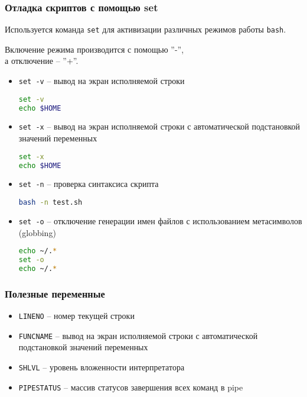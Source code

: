 \begin{frame}
	\frametitle{Отладка скриптов с помощью set}
	
	Используется команда {\tt set} для активизации различных режимов работы {\tt bash}.

	Включение режима производится с помощью ''-'',\\
	а отключение -- ''+''.

	\begin{itemize}
		\item {\tt set -v} -- вывод на экран исполняемой строки
			\begin{lstlisting}[language=sh]
set -v
echo $HOME
			\end{lstlisting}

		\item {\tt set -x} -- вывод на экран исполняемой строки с автоматической подстановкой значений переменных
\begin{lstlisting}[language=sh]
set -x
echo $HOME
\end{lstlisting}

		\item {\tt set -n} -- проверка синтаксиса скрипта
\begin{lstlisting}[language=sh]
bash -n test.sh
\end{lstlisting} 


		\item {\tt set -o} -- отключение генерации имен файлов с использованием метасимволов (globbing)
\begin{lstlisting}[language=sh]
echo ~/.*
set -o
echo ~/.*
\end{lstlisting} 

	\end{itemize}
\end{frame}

\begin{frame}[fragile]
	\frametitle{Полезные переменные}

	\begin{itemize}
		\item {\tt LINENO} -- номер текущей строки
		\item {\tt FUNCNAME} -- вывод на экран исполняемой строки с автоматической подстановкой значений переменных
		\item {\tt SHLVL} -- уровень вложенности интерпретатора
		\item {\tt PIPESTATUS} -- массив статусов завершения всех команд в pipe
	\end{itemize}
\end{frame}

